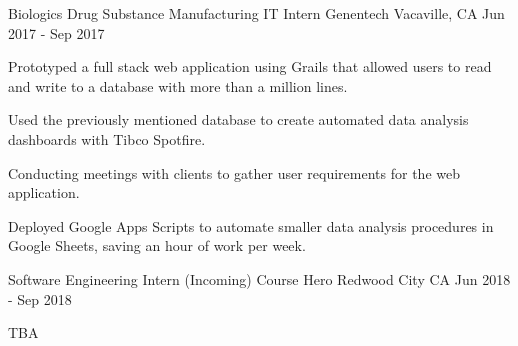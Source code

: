 

\begin{cventries}

  \cventry
  {Biologics Drug Substance Manufacturing IT Intern} %
  {Genentech} %
  {Vacaville, CA} %
  {Jun 2017 - Sep 2017} %
  {
  \begin{cvitems} %
    \item {Prototyped a full stack web application using Grails that allowed users to read and write to a database with more than a million lines.}
    \item {Used the previously mentioned database to create automated data analysis dashboards with Tibco Spotfire.}
    \item {Conducting meetings with clients to gather user requirements for the web application.}
    \item {Deployed Google Apps Scripts to automate smaller data analysis procedures in Google Sheets, saving an hour of work per week.}
  \end{cvitems}
  }
  \cventry
  {Software Engineering Intern (Incoming)}
  {Course Hero}
  {Redwood City CA}
  {Jun 2018 - Sep 2018}
  {
  \begin{cvitems}
    \item TBA
  \end{cvitems}
  }
\end{cventries}
